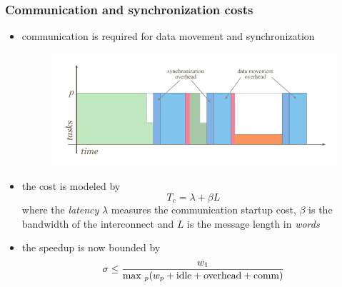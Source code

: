 \begin{frame}[fragile]
%
  \frametitle{Communication and synchronization costs}
%
  \begin{itemize}
%
  \item communication is required for data movement and synchronization
    \begin{figure}
      \centering
      \includegraphics[scale=0.75]{figures/reduction-comsync.pdf}
    \end{figure}
%
  \item the cost is modeled by
    \[
    T_{c} = \lambda + \beta L
    \]
    where the {\em latency} $\lambda$ measures the communication startup cost, $\beta$ is the
    bandwidth of the interconnect and $L$ is the message length in {\em words} 
%
  \item the speedup is now bounded by
    \[
    \sigma \leq \frac{w_{1}}{{\rm max\ }_{p}(w_{p} + {\rm idle} + {\rm overhead} + {\rm comm})}
    \]
%      
  \end{itemize}
%
\end{frame}

